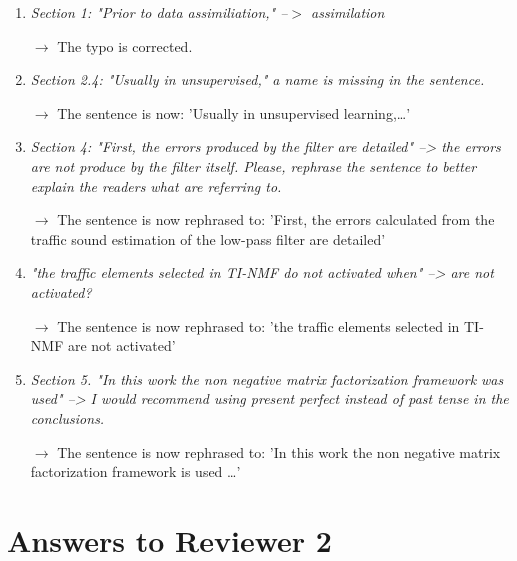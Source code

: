 \documentclass[10pt]{article}
\begin{document}
\begin{enumerate}
\item \emph{Section 1: "Prior to data assimiliation," --$>$ assimilation}

$\rightarrow$ The typo is corrected.

\item \emph{Section 2.4: "Usually in unsupervised," a name is missing in the sentence.}

$\rightarrow$ The sentence is now: 'Usually in unsupervised learning,…'

\item \emph{Section 4:
"First, the errors produced by the filter are detailed" --> the errors are not produce by the filter itself. Please, rephrase the sentence to better explain the readers what are referring to.}

$\rightarrow$ The sentence is now rephrased to: 'First, the errors calculated from the traffic sound estimation of the low-pass filter are detailed'

\item \emph{"the traffic elements selected in TI-NMF do not activated when" --> are not activated?}

$\rightarrow$ The sentence is now rephrased to: 'the traffic elements selected in TI-NMF are not activated'

\item \emph{Section 5. "In this work the non negative matrix factorization framework was used" --> I would recommend using present perfect instead of past tense in the conclusions.}

$\rightarrow$ The sentence is now rephrased to: 'In this work the non negative matrix factorization framework is used \dots'

\end{enumerate}

\section{Answers to Reviewer 2}
\end{document}
